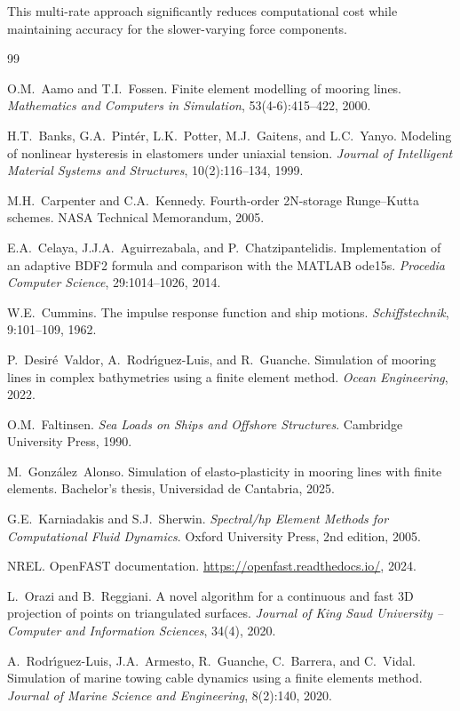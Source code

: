 \documentclass[11pt]{article}
\begin{document}
This multi-rate approach significantly reduces computational cost while maintaining accuracy for the slower-varying force components.


\clearpage

\begin{thebibliography}{99}

O.M.~Aamo and T.I.~Fossen.
\newblock Finite element modelling of mooring lines.
\newblock \emph{Mathematics and Computers in Simulation}, 53(4-6):415--422, 2000.

H.T.~Banks, G.A.~Pint\'er, L.K.~Potter, M.J.~Gaitens, and L.C.~Yanyo.
\newblock Modeling of nonlinear hysteresis in elastomers under uniaxial tension.
\newblock \emph{Journal of Intelligent Material Systems and Structures}, 10(2):116--134, 1999.

M.H.~Carpenter and C.A.~Kennedy.
\newblock Fourth-order 2N-storage Runge--Kutta schemes.
\newblock NASA Technical Memorandum, 2005.

E.A.~Celaya, J.J.A.~Aguirrezabala, and P.~Chatzipantelidis.
\newblock Implementation of an adaptive BDF2 formula and comparison with the MATLAB ode15s.
\newblock \emph{Procedia Computer Science}, 29:1014--1026, 2014.

W.E.~Cummins.
\newblock The impulse response function and ship motions.
\newblock \emph{Schiffstechnik}, 9:101--109, 1962.

P.~Desir\'e~Valdor, A.~Rodr\'\i guez-Luis, and R.~Guanche.
\newblock Simulation of mooring lines in complex bathymetries using a finite element method.
\newblock \emph{Ocean Engineering}, 2022.

O.M.~Faltinsen.
\newblock \emph{Sea Loads on Ships and Offshore Structures}.
\newblock Cambridge University Press, 1990.

M.~Gonz\'alez~Alonso.
\newblock Simulation of elasto-plasticity in mooring lines with finite elements.
\newblock Bachelor's thesis, Universidad de Cantabria, 2025.

G.E.~Karniadakis and S.J.~Sherwin.
\newblock \emph{Spectral/hp Element Methods for Computational Fluid Dynamics}.
\newblock Oxford University Press, 2nd edition, 2005.

NREL.
\newblock OpenFAST documentation.
\newblock \url{https://openfast.readthedocs.io/}, 2024.

L.~Orazi and B.~Reggiani.
\newblock A novel algorithm for a continuous and fast 3D projection of points on triangulated surfaces.
\newblock \emph{Journal of King Saud University -- Computer and Information Sciences}, 34(4), 2020.

A.~Rodr\'\i guez-Luis, J.A.~Armesto, R.~Guanche, C.~Barrera, and C.~Vidal.
\newblock Simulation of marine towing cable dynamics using a finite elements method.
\newblock \emph{Journal of Marine Science and Engineering}, 8(2):140, 2020.

\end{thebibliography}
\end{document}
